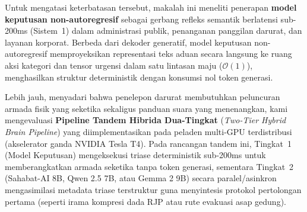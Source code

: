 \documentclass[journal,compsoc]{IEEEtran}
\begin{document}
Untuk mengatasi keterbatasan tersebut, makalah ini meneliti penerapan \textbf{model keputusan non-autoregresif} sebagai gerbang refleks semantik berlatensi sub-200ms (Sistem~1) dalam administrasi publik, penanganan panggilan darurat, dan layanan korporat. Berbeda dari dekoder generatif, model keputusan non-autoregresif memproyeksikan representasi teks aduan secara langsung ke ruang aksi kategori dan tensor urgensi dalam satu lintasan maju ($\mathcal{O}(1)$), menghasilkan struktur deterministik dengan konsumsi nol token generasi.

Lebih jauh, menyadari bahwa penelepon darurat membutuhkan peluncuran armada fisik yang seketika sekaligus panduan suara yang menenangkan, kami mengevaluasi \textbf{Pipeline Tandem Hibrida Dua-Tingkat} (\textit{Two-Tier Hybrid Brain Pipeline}) yang diimplementasikan pada peladen multi-GPU terdistribusi (akselerator ganda NVIDIA Tesla T4). Pada rancangan tandem ini, Tingkat~1 (Model Keputusan) mengeksekusi triase deterministik sub-200ms untuk memberangkatkan armada seketika tanpa token generasi, sementara Tingkat~2 (Sahabat-AI 8B, Qwen 2.5 7B, atau Gemma 2 9B) secara paralel/asinkron mengasimilasi metadata triase terstruktur guna menyintesis protokol pertolongan pertama (seperti irama kompresi dada RJP atau rute evakuasi asap gedung).
\end{document}
